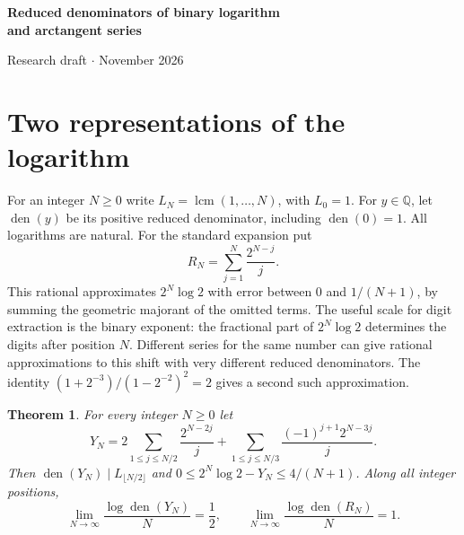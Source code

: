 \documentclass[11pt]{article}
\newtheorem{theorem}{Theorem}[section]
\DeclareMathOperator{\den}{den}
\DeclareMathOperator{\lcm}{lcm}
\newcommand{\Q}{\mathbb Q}
\begin{document}
\begin{center}
{\LARGE\bfseries Reduced denominators of binary logarithm\\[2pt] and arctangent series\par}
\vspace{6pt}
{\small Research draft \enspace$\cdot$ November 2026}
\end{center}
\begin{abstract}
Truncating the Taylor series for $\log 2$ at binary exponent $N$ and multiplying by
$2^N$ gives a rational whose reduced denominator has logarithm $N+o(N)$.
A representation using the two arguments $1-2^{-2}$ and $1+2^{-3}$ reduces this
to $N/2+o(N)$. We determine the rate for every finite integer combination of
dyadic logarithms with nonzero sum. Bang's primitive divisor theorem gives the
minimum rate and all cases of equality for representations of a nonzero integer
multiple of $\log 2$. Integral corrections bound common denominators for approximations valid over a linear number of further shifts. For one 64-bit block of $\log 2$, residues of the numerators force at least 18 digit changes when only selected prime factors of the modulus are retained. We also obtain reduced-denominator rate $2/3$ for specified binary series for $\arctan(1/2)$ and $\pi$.
\end{abstract}

\section{Two representations of the logarithm}
For an integer $N\ge0$ write $L_N=\lcm(1,\ldots,N)$, with $L_0=1$.
For $y\in\Q$, let $\den(y)$ be its positive reduced denominator, including
$\den(0)=1$. All logarithms are natural. For the standard expansion put
\[
 R_N=\sum_{j=1}^N\frac{2^{N-j}}{j}.
\]
This rational approximates $2^N\log 2$ with error between $0$ and $1/(N+1)$,
by summing the geometric majorant of the omitted terms. The useful scale for digit extraction is the binary exponent: the fractional part of $2^N\log 2$ determines the digits after position $N$. Different series for the same number can give rational approximations to this shift with very different reduced denominators. The identity $(1+2^{-3})/(1-2^{-2})^2=2$ gives a second such approximation.

\begin{theorem}\label{th:half}
For every integer $N\ge0$ let
\[
 Y_N=2\sum_{1\le j\le N/2}\frac{2^{N-2j}}j+
       \sum_{1\le j\le N/3}\frac{(-1)^{j+1}2^{N-3j}}j .
\]
Then $\den(Y_N)\mid L_{\lfloor N/2\rfloor}$ and
$0\le 2^N\log 2-Y_N\le4/(N+1)$. Along all integer positions,
\[
 \lim_{N\to\infty}\frac{\log\den(Y_N)}N=\frac12,\qquad
 \lim_{N\to\infty}\frac{\log\den(R_N)}N=1 .
\]
\end{theorem}
\end{document}
